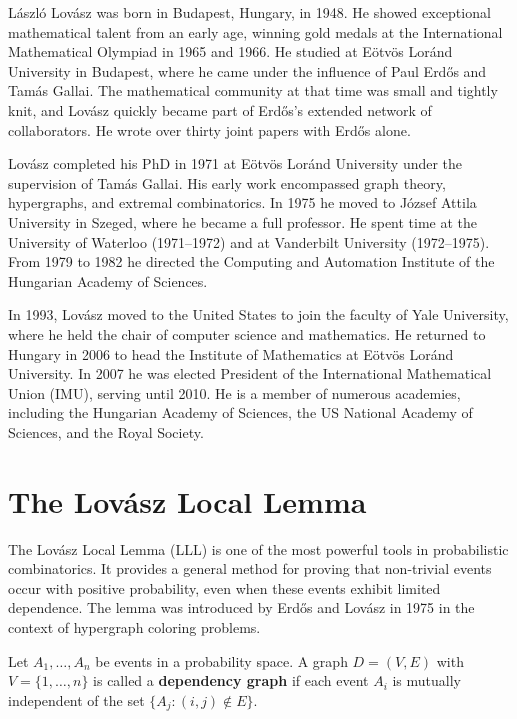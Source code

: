 L\'{a}szl\'{o} Lov\'{a}sz was born in Budapest, Hungary, in 1948. He showed exceptional mathematical talent from an early age, winning gold medals at the International Mathematical Olympiad in 1965 and 1966. He studied at E\"{o}tv\"{o}s Lor\'{a}nd University in Budapest, where he came under the influence of Paul Erd\H{o}s and Tam\'{a}s Gallai. The mathematical community at that time was small and tightly knit, and Lov\'{a}sz quickly became part of Erd\H{o}s's extended network of collaborators. He wrote over thirty joint papers with Erd\H{o}s alone.

Lov\'{a}sz completed his PhD in 1971 at E\"{o}tv\"{o}s Lor\'{a}nd University under the supervision of Tam\'{a}s Gallai. His early work encompassed graph theory, hypergraphs, and extremal combinatorics. In 1975 he moved to J\'{o}zsef Attila University in Szeged, where he became a full professor. He spent time at the University of Waterloo (1971--1972) and at Vanderbilt University (1972--1975). From 1979 to 1982 he directed the Computing and Automation Institute of the Hungarian Academy of Sciences.

In 1993, Lov\'{a}sz moved to the United States to join the faculty of Yale University, where he held the chair of computer science and mathematics. He returned to Hungary in 2006 to head the Institute of Mathematics at E\"{o}tv\"{o}s Lor\'{a}nd University. In 2007 he was elected President of the International Mathematical Union (IMU), serving until 2010. He is a member of numerous academies, including the Hungarian Academy of Sciences, the US National Academy of Sciences, and the Royal Society.

\section{The Lov\'{a}sz Local Lemma}

The Lov\'{a}sz Local Lemma (LLL) is one of the most powerful tools in probabilistic combinatorics. It provides a general method for proving that non-trivial events occur with positive probability, even when these events exhibit limited dependence. The lemma was introduced by Erd\H{o}s and Lov\'{a}sz in 1975 in the context of hypergraph coloring problems.

\begin{definition}
Let \(A_1, \dots, A_n\) be events in a probability space. A graph \(D = (V,E)\) with \(V = \{1,\dots,n\}\) is called a \textbf{dependency graph} if each event \(A_i\) is mutually independent of the set \(\{A_j : (i,j) \notin E\}\).
\end{definition}

